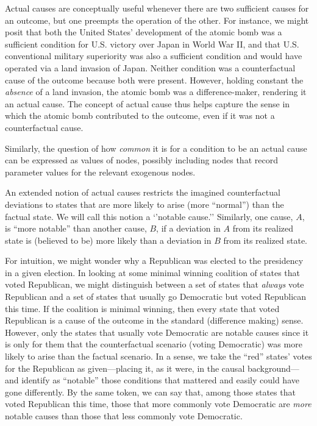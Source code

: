 \documentclass[
  12pt,
]{book}
\begin{document}
Actual causes are conceptually useful whenever there are two sufficient causes for an outcome, but one preempts the operation of the other. For instance, we might posit that both the United States' development of the atomic bomb was a sufficient condition for U.S. victory over Japan in World War II, and that U.S. conventional military superiority was also a sufficient condition and would have operated via a land invasion of Japan. Neither condition was a counterfactual cause of the outcome because both were present. However, holding constant the \emph{absence} of a land invasion, the atomic bomb was a difference-maker, rendering it an actual cause. The concept of actual cause thus helps capture the sense in which the atomic bomb contributed to the outcome, even if it was not a counterfactual cause.

Similarly, the question of how \emph{common} it is for a condition to be an actual cause can be expressed as values of nodes, possibly including nodes that record parameter values for the relevant exogenous nodes.

An extended notion \citep[p 81]{halpern2016actual} of actual causes restricts the imagined counterfactual deviations to states that are more likely to arise (more ``normal'') than the factual state. We will call this notion a `'notable cause.'' Similarly, one cause, \(A\), is ``more notable'' than another cause, \(B\), if a deviation in \(A\) from its realized state is (believed to be) more likely than a deviation in \(B\) from its realized state.

For intuition, we might wonder why a Republican was elected to the presidency in a given election. In looking at some minimal winning coalition of states that voted Republican, we might distinguish between a set of states that \emph{always} vote Republican and a set of states that usually go Democratic but voted Republican this time. If the coalition is minimal winning, then every state that voted Republican is a cause of the outcome in the standard (difference making) sense. However, only the states that usually vote Democratic are notable causes since it is only for them that the counterfactual scenario (voting Democratic) was more likely to arise than the factual scenario. In a sense, we take the ``red'' states' votes for the Republican as given---placing it, as it were, in the causal background---and identify as ``notable'' those conditions that mattered and easily could have gone differently. By the same token, we can say that, among those states that voted Republican this time, those that more commonly vote Democratic are \emph{more} notable causes than those that less commonly vote Democratic.
\end{document}
